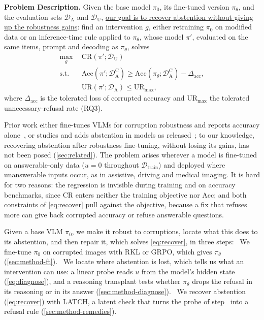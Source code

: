 \begin{tcolorbox}[enhanced, breakable, colback=probback, colframe=probframe, arc=2mm,
  boxrule=0.8pt, left=5pt, right=5pt, top=4pt, bottom=4pt]
\textbf{Problem Description.} Given the base model $\pi_0$, its fine-tuned version
$\pi_\theta$, and the evaluation sets $\mathcal{D}_{\mathrm{A}}$ and $\mathcal{D}_{\mathrm{U}}$, \uline{our goal is to recover abstention without giving up the robustness gains}: find an intervention $g$, either retraining $\pi_0$ on modified data or an inference-time rule applied to $\pi_\theta$, whose model $\pi'$, evaluated on the same items, prompt and
decoding as $\pi_\theta$, solves
\begin{equation}
\begin{aligned}
\max_{g}\ \ & \mathrm{CR}(\pi';\mathcal{D}_{\mathrm{U}}) \\
\text{s.t.}\ \ & \mathrm{Acc}(\pi';\mathcal{D}_{\mathrm{A}}^{\mathrm{C}}) \ge
  \mathrm{Acc}(\pi_\theta;\mathcal{D}_{\mathrm{A}}^{\mathrm{C}}) - \Delta_{\mathrm{acc}}, \\
& \mathrm{UR}(\pi';\mathcal{D}_{\mathrm{A}}) \le \mathrm{UR}_{\max},
\end{aligned}
\label{eq:recover}
\end{equation}
where $\Delta_{\mathrm{acc}}$ is the tolerated loss of corrupted accuracy and
$\mathrm{UR}_{\max}$ the tolerated unnecessary-refusal rate (RQ3).
\end{tcolorbox}

Prior work either fine-tunes VLMs for corruption robustness and reports accuracy
alone~\cite{he2026videoreasoningmodelsready,tang2026robustr1,liu2026roma}, or studies and adds abstention in models as released~\cite{miyai2024upd,zhu2025mohobench,madhusudhan2026knowing,pramono2026trapsbench,he2026knowing,vardi2025clipup}; to our knowledge, recovering abstention after robustness fine-tuning, without losing its gains, has not been posed (\cref{sec:related}). The problem arises wherever a model is fine-tuned on answerable-only data ($u = 0$ throughout $\mathcal{D}_{\mathrm{train}}$) and deployed where unanswerable inputs occur, as in assistive, driving and medical imaging. It is hard for two reasons: the regression is invisible during training and on accuracy benchmarks, since $\mathrm{CR}$ enters neither the training objective nor $\mathrm{Acc}$; and both constraints of \cref{eq:recover} pull against the objective, because a fix that refuses more can give back corrupted accuracy or
refuse answerable questions.

Given a base VLM $\pi_0$, we make it robust to corruptions, locate what this does to its
abstention, and then repair it, which solves \cref{eq:recover}, in three
steps:
~We fine-tune $\pi_0$ on corrupted images with RKL or GRPO, which gives
$\pi_\theta$ (\cref{sec:method-ft}).
~We locate where abstention is lost, which tells us what an intervention can use:
a linear probe reads $u$ from the model's hidden state (\cref{eq:diagnose}), and a
reasoning transplant tests whether $\pi_\theta$ drops the refusal in its reasoning or in
its answer (\cref{sec:method-diagnose}).
~We recover abstention (\cref{eq:recover}) with LATCH, a latent check that turns
the probe of step~ into a refusal rule (\cref{sec:method-remedies}).

